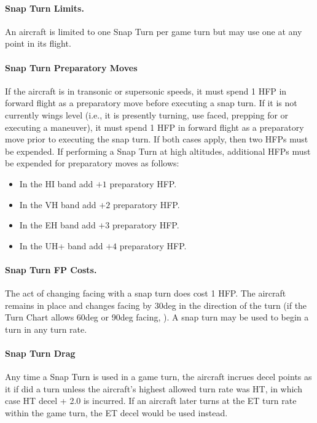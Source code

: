 \begin{advancedrules}
{\paragraph{Snap Turn Limits.} An aircraft is limited to one Snap Turn per game turn but may use one at any point in its flight.

\paragraph{Snap Turn Preparatory Moves} If the aircraft is in transonic or supersonic speeds, it must spend 1 HFP in forward flight as a preparatory move before executing a snap turn. If it is not currently wings level (i.e., it is presently turning, use faced, prepping for or executing a maneuver), it must spend 1 HFP in forward flight as a preparatory move prior to executing the snap turn. If both cases apply, then two HFPs must be expended. If performing a Snap Turn at high altitudes, additional HFPs must be expended for preparatory moves as follows:

\begin{itemize}
    \item In the HI band add $+1$ preparatory HFP.
    \item In the VH band add $+2$ preparatory HFP.
    \item In the EH band add $+3$ preparatory HFP.
    \item In the UH+ band add $+4$ preparatory HFP.
\end{itemize}

\paragraph{Snap Turn FP Costs.} The act of changing facing with a snap turn does cost 1 HFP.  The aircraft remains in place and changes facing by 30{deg} in the direction of the turn (if the Turn Chart allows 60{deg} or 90{deg} facing, ). A snap turn may be used to begin a turn in any turn rate.

\paragraph{Snap Turn Drag} Any time a Snap Turn is used in a game turn, the aircraft incrues decel points as it if did a  turn unless the aircraft's highest allowed turn rate was HT, in which case HT decel + 2.0 is incurred. If an aircraft later turns at the ET turn rate within the game turn, the ET decel would be used instead.

}
\end{advancedrules}
